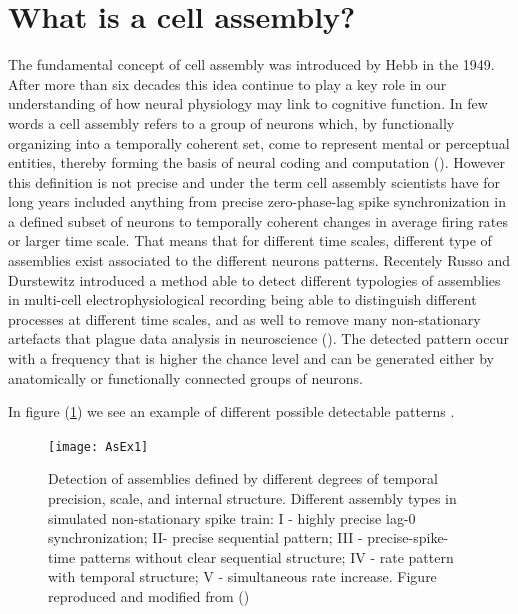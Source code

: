 \documentclass{article}
\begin{document}
\section{What is a cell assembly?}
The fundamental concept of cell assembly was introduced by Hebb in the 1949. After more than six decades this idea continue to play a key role in our understanding of how neural physiology may link to cognitive function.
In few words a cell assembly refers to a group of neurons which, by functionally organizing into a temporally coherent set, come to represent mental or perceptual entities, thereby forming the basis  of neural coding and computation (\cite{Hebb}). However this definition is not precise and under the term cell assembly scientists have for long years included anything from precise zero-phase-lag spike synchronization in a defined subset of neurons to temporally coherent changes in average firing rates or larger time scale. That means that for different time scales, different type of assemblies exist associated to the different neurons patterns.
Recentely Russo and Durstewitz introduced a method able to detect different typologies of assemblies in multi-cell electrophysiological recording being able to distinguish different processes at different time scales, and as well to remove many non-stationary artefacts that plague data analysis in neuroscience (\cite{RussoDurstewitz}).
The detected pattern occur with a frequency that is higher the chance level and can be generated either by anatomically or functionally connected groups of neurons.


In figure (\ref{fig: AsEx}) we see an example of different possible detectable patterns . 
\begin{figure}[!ht]
  \begin{center}
    \texttt{[image: AsEx1]}
  \end{center}
\caption{\footnotesize{Detection of assemblies defined by different degrees of temporal precision, scale, and internal structure. Different assembly types in simulated non-stationary spike train: I - highly precise lag-0 synchronization; II- precise sequential pattern; III - precise-spike-time patterns without clear sequential structure; IV - rate pattern with temporal structure; V - simultaneous rate increase. Figure reproduced and modified from (\cite{RussoDurstewitz})}}
\label{fig: AsEx}
\end{figure}
\end{document}

